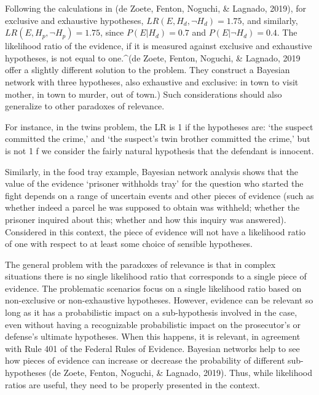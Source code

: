 \documentclass[
  10pt,
  dvipsnames,enabledeprecatedfontcommands]{scrartcl}
\newcommand{\mar}[1]{\todo[color=blue!40]{#1}}
\begin{document}
\noindent Following the calculations in (de Zoete, Fenton, Noguchi, \&
Lagnado, 2019), for exclusive and exhaustive hypotheses,
\(LR(E,H_d,\neg H_d)=1.75\), and similarly,
\(LR(E,H_p, \neg H_p)=1.75\), since \(P(E\vert H_d)=0.7\) and
\(P(E\vert \neg H_d)=0.4\). The likelihood ratio of the evidence, if it
is measured against exclusive and exhaustive hypotheses, is not equal to
one.\^{}(de Zoete, Fenton, Noguchi, \& Lagnado, 2019 offer a slightly
different solution to the problem. They construct a Bayesian network
with three hypotheses, also exhaustive and exclusive: in town to visit
mother, in town to murder, out of town.) Such considerations should also
generalize to other paradoxes of relevance.

For instance, in the twins problem, the LR is 1 if the hypotheses are:
`the suspect committed the crime,' and `the suspect's twin brother
committed the crime,' but is not 1 f we consider the fairly natural
hypothesis that the defendant is innocent.

Similarly, in the food tray example, Bayesian network analysis shows
that the value of the evidence `prisoner withholds tray' for the
question who started the fight depends on a range of uncertain events
and other pieces of evidence (such as whether indeed a parcel he was
supposed to obtain was withheld; whether the prisoner inquired about
this; whether and how this inquiry was answered). Considered in this
context, the piece of evidence will not have a likelihood ratio of one
with respect to at least some choice of sensible hypotheses.

The general problem with the paradoxes of relevance is that in complex
situations there is no single likelihood ratio that corresponds to a
single piece of evidence. The problematic scenarios focus on a single
likelihood ratio based on non-exclusive or non-exhaustive hypotheses.
However, evidence can be relevant so long as it has a probabilistic
impact on a sub-hypothesis involved in the case, even without having a
recognizable probabilistic impact on the prosecutor's or defense's
ultimate hypotheses. When this happens, it is relevant, in agreement
with Rule 401 of the Federal Rules of Evidence. Bayesian networks help
to see how pieces of evidence can increase or decrease the probability
of different sub-hypotheses (de Zoete, Fenton, Noguchi, \& Lagnado,
2019). Thus, while likelihood ratios are useful, they need to be
properly presented in the context.

\mar{Added the conclusions section, check.}
\end{document}

